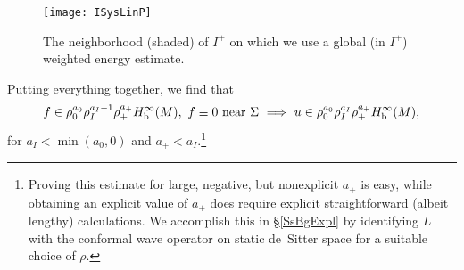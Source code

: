 \documentclass[reqno,11pt,letterpaper]{amsart}
\numberwithin{equation}{section}
\numberwithin{figure}{section}
\theoremstyle{definition}
\theoremstyle{remark}
\newcommand{\Lra}{\Longrightarrow}
\newcommand{\tn}{\textnormal}
\newcommand{\bop}{{\mathrm{b}}}
\newcommand{\Hb}{H_{\bop}}
\begin{document}
\begin{figure}[!ht]
\texttt{[image: ISysLinP]}
\caption{The neighborhood (shaded) of $I^+$ on which we use a global (in $I^+$) weighted energy estimate.}
\label{FigISysLinP}
\end{figure}

Putting everything together, we find that
\begin{equation}
\label{EqISysLinBg}
  f\in\rho_0^{a_0}\rho_I^{a_I-1}\rho_+^{a_+}\Hb^\infty(M),\ f\equiv 0\ \tn{near}\ \Sigma\ \Lra\ u\in\rho_0^{a_0}\rho_I^{a_I}\rho_+^{a_+}\Hb^\infty(M),
\end{equation}
for $a_I<\min(a_0,0)$ and $a_+<a_I$.\footnote{Proving this estimate for large, negative, but nonexplicit $a_+$ is easy, while obtaining an explicit value of $a_+$ does require explicit straightforward (albeit lengthy) calculations. We accomplish this in \S\ref{SsBgExpl} by identifying $L$ with the conformal wave operator on static de~Sitter space for a suitable choice of $\rho$.}
\end{document}
